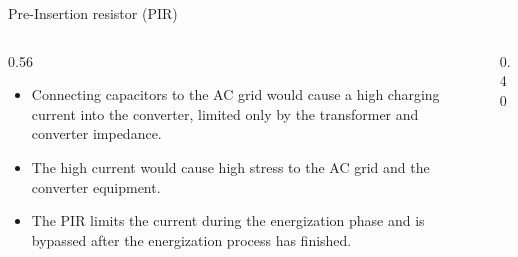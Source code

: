 
\begin{frame}{Pre-Insertion resistor (PIR)}
  \begin{columns}[c,onlytextwidth]
    \begin{column}{0.56\textwidth}
      \begin{itemize}
        \setlength{\itemsep}{0.5em}
        \item Connecting capacitors to the AC grid would cause a high
              charging current into the converter, limited only by the
              transformer and converter impedance.
        \item The high current would cause high stress to the AC grid and
              the converter equipment.
        \item The PIR limits the current during the energization phase and
              is bypassed after the energization process has finished.
      \end{itemize}
    \end{column}
    \begin{column}{0.40\textwidth}
      \centering
    \end{column}
  \end{columns}
\end{frame}
